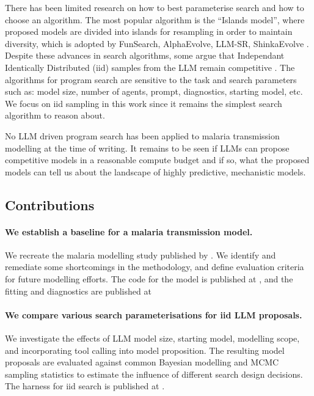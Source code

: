 \documentclass[11pt]{article}
\begin{document}
There has been limited research on how to best parameterise search and how to choose an algorithm. The most popular algorithm is the ``Islands model'', where proposed models are divided into islands for resampling in order to maintain diversity, which is adopted by FunSearch, AlphaEvolve, LLM-SR, ShinkaEvolve \citep{Romera-Paredes2024Jan,Novikov2025Jun,Shojaee2024Apr,Lange2025Sep}. Despite these advances in search algorithms, some argue that Independant Identically Distributed (iid) samples from the LLM remain competitive \citep{Gideoni2026Feb}. The algorithms for program search are sensitive to the task and search parameters such as: model size, number of agents, prompt, diagnostics, starting model, etc. We focus on iid sampling in this work since it remains the simplest search algorithm to reason about.

No LLM driven program search has been applied to malaria transmission modelling at the time of writing. It remains to be seen if LLMs can propose competitive models in a reasonable compute budget and if so, what the proposed models can tell us about the landscape of highly predictive, mechanistic models.

\subsection{Contributions}

\paragraph{We establish a baseline for a malaria transmission model.} We recreate the malaria modelling study published by \citet{griffin_estimates_2014}. We identify and remediate some shortcomings in the methodology, and define evaluation criteria for future modelling efforts. The code for the model is published at \citep{Charles2024}, and the fitting and diagnostics are published at \citep{Charles2026Msinf}

\paragraph{We compare various search parameterisations for iid LLM proposals.} We investigate the effects of LLM model size, starting model, modelling scope, and incorporating tool calling into model proposition. The resulting model proposals are evaluated against common Bayesian modelling and MCMC sampling statistics to estimate the influence of different search design decisions. The harness for iid search is published at \citep{Charles2026Disc}.
\end{document}

